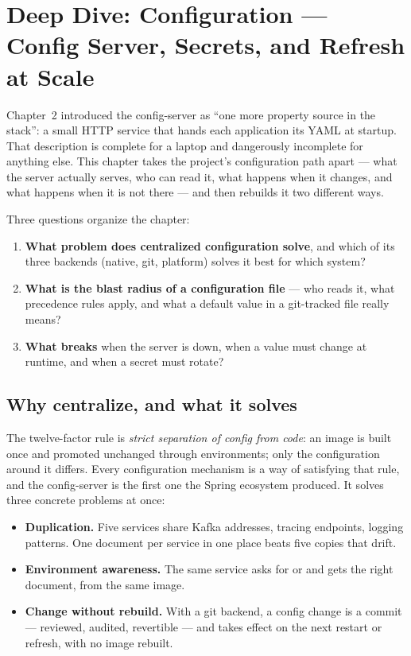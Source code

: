 \chapter{Deep Dive: Configuration --- Config Server, Secrets, and Refresh at Scale}
\label{ch:dd-config}

Chapter~2 introduced the config-server as ``one more property source in
the stack'': a small HTTP service that hands each application its YAML at
startup. That description is complete for a laptop and dangerously
incomplete for anything else. This chapter takes the project's
configuration path apart --- what the server actually serves, who can
read it, what happens when it changes, and what happens when it is not
there --- and then rebuilds it two different ways.

Three questions organize the chapter:

\begin{enumerate}
  \item \textbf{What problem does centralized configuration solve}, and
  which of its three backends (native, git, platform) solves it best for
  which system?
  \item \textbf{What is the blast radius of a configuration file} ---
  who reads it, what precedence rules apply, and what a default value in
  a git-tracked file really means?
  \item \textbf{What breaks} when the server is down, when a value must
  change at runtime, and when a secret must rotate?
\end{enumerate}

\section{Why centralize, and what it solves}

The twelve-factor rule is \emph{strict separation of config from code}:
an image is built once and promoted unchanged through environments; only
the configuration around it differs. Every configuration mechanism is a
way of satisfying that rule, and the config-server is the first one the
Spring ecosystem produced. It solves three concrete problems at once:

\begin{itemize}
  \item \textbf{Duplication.} Five services share Kafka addresses,
  tracing endpoints, logging patterns. One document per service in one
  place beats five copies that drift.
  \item \textbf{Environment awareness.} The same service asks for
   or  and gets
  the right document, from the same image.
  \item \textbf{Change without rebuild.} With a git backend, a config
  change is a commit --- reviewed, audited, revertible --- and takes
  effect on the next restart or refresh, with no image rebuilt.
\end{itemize}

